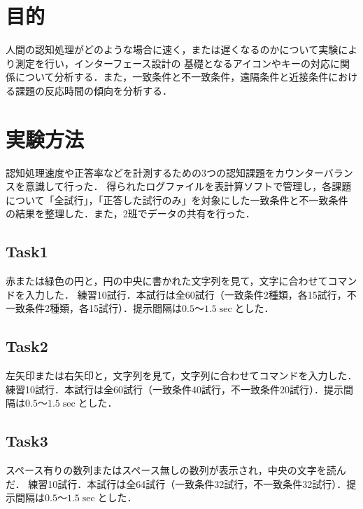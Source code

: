 \documentclass{jlreq}
\numberwithin{equation}{section}
\begin{document}
\tableofcontents
\clearpage

\section{目的}
人間の認知処理がどのような場合に速く，または遅くなるのかについて実験により測定を行い，インターフェース設計の
基礎となるアイコンやキーの対応に関係について分析する．また，一致条件と不一致条件，遠隔条件と近接条件における課題の反応時間の傾向を分析する．


\section{実験方法}
認知処理速度や正答率などを計測するための3つの認知課題をカウンターバランスを意識して行った．
得られたログファイルを表計算ソフトで管理し，各課題について「全試行」，「正答した試行のみ」を対象にした一致条件と不一致条件
の結果を整理した．また，2班でデータの共有を行った．

\subsection{Task1}
赤または緑色の円と，円の中央に書かれた文字列を見て，文字に合わせてコマンドを入力した．
練習10試行．本試行は全60試行（一致条件2種類，各15試行，不一致条件2種類，各15試行）．提示間隔は$0.5 \text{～} 1.5 \si{\sec}$とした．

\subsection{Task2}
左矢印または右矢印と，文字列を見て，文字列に合わせてコマンドを入力した．
練習10試行．本試行は全60試行（一致条件40試行，不一致条件20試行）．提示間隔は$0.5 \text{～} 1.5 \si{\sec}$とした．

\subsection{Task3}
スペース有りの数列またはスペース無しの数列が表示され，中央の文字を読んだ．
練習10試行．本試行は全64試行（一致条件32試行，不一致条件32試行）．提示間隔は$0.5 \text{～} 1.5 \si{\sec}$とした．
\end{document}
